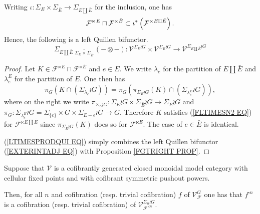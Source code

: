 \documentclass[a4paper,10pt]{article}%
\begin{document}
\begin{proposition}\label{LTIMESPRODINC PROP}
  Writing 
  $\iota \colon \Sigma_E \times \Sigma_{\bar{E}} \to
  \Sigma_{E \amalg \bar{E}}$ for the inclusion, one has 
  \begin{equation}\label{LTIMESPRODINC EQ}
    \mathcal{F}^{\ltimes E}
    \sqcap
    \mathcal{F}^{\ltimes \bar{E}}
    \subset
    \iota^{\**}\left(\mathcal{F}^{\ltimes E \amalg \bar{E}}\right).
  \end{equation}
  Hence, the following is a left Quillen bifunctor.
  \begin{equation}\label{LTIMESPRODQUI EQ}
    \Sigma_{E \amalg \bar{E}} 
    \underset{\Sigma_E \times \Sigma_{\bar{E}}}{\cdot}
    (\minus \otimes \minus)
    \colon
    \mathcal{V}^{\Sigma_E \wr G}
    \times
    \mathcal{V}^{\Sigma_{\bar{E}} \wr G}
    \to
    \mathcal{V}^{\Sigma_{E \amalg \bar{E}} \wr G}
  \end{equation}
\end{proposition}



\begin{proof}
  Let 
  $K \in 
  \mathcal{F}^{\ltimes E}
  \sqcap
  \mathcal{F}^{\ltimes \bar{E}}	
  $
  and $e \in E$. 
  We write $\lambda_e$ for the partition of $E \amalg \bar{E}$
  and $\lambda_e^E$ for the partition of $E$.
  One then has
  \begin{equation}
    \pi_G
    \left(
      K \cap \left( \Sigma_{\lambda_e} \wr G \right) \right)
    =
    \pi_G
    \left(
      \pi_{\Sigma_E \wr G}(K)
      \cap \left( \Sigma_{\lambda_e^E} \wr G \right)
    \right),
  \end{equation}
  where on the right we write
  $\pi_{\Sigma_E \wr G} \colon
  \Sigma_E \wr G \times \Sigma_{\bar{E}} \wr G
  \to 
  \Sigma_E \wr G$
  and 
  $\pi_G \colon \Sigma_{\lambda^E_e} \wr G
  =\Sigma_{\{e\}} \times G \times \Sigma_{E-e} \wr G
  \to G$. Therefore $K$ 
  satisfies (\ref{FLTIMESN2 EQ}) for 
  $\mathcal{F}^{\ltimes E \amalg \bar{E}}$
  since 
  $\pi_{\Sigma_E \wr G}(K)$ does so for 
  $\mathcal{F}^{\ltimes E}$.
  The case of $e \in \bar{E}$ is identical.

  (\ref{LTIMESPRODQUI EQ}) simply combines 
  the left Quillen bifunctor
  (\ref{EXTERINTADJ EQ}) with 
  Proposition \ref{FGTRIGHT PROP}.
\end{proof}


\begin{proposition}\label{POWERF PROP}
  Suppose that $\mathcal{V}$ is a cofibrantly generated closed monoidal model category with cellular fixed points and with cofibrant symmetric pushout powers.
  
  Then, for all $n$ and cofibration (resp. trivial cofibration) $f$ of $\mathcal{V}^{G}_{\mathcal{F}}$
  one has that $f^{\square n}$ is a cofibration (resp. trivial cofibration) of $\mathcal{V}^{\Sigma_n \wr G}_{\mathcal{F}^{\ltimes n}}$.
\end{proposition}
\end{document}
